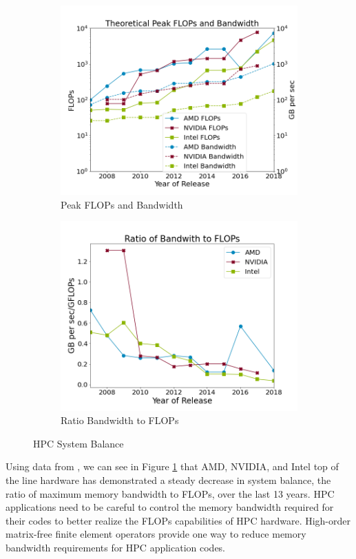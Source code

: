 \begin{figure}[h!]
\begin{subfigure}{.49\textwidth}
\includegraphics[width=.99\linewidth]{../img/peakFlopsAndBandwidth}
\caption{Peak FLOPs and Bandwidth}
\end{subfigure}
\begin{subfigure}{.49\textwidth}
\includegraphics[width=.99\linewidth]{../img/peakRatio}
\caption{Ratio Bandwidth to FLOPs}
\end{subfigure}
\caption{HPC System Balance}
\label{fig:peakratio}
\end{figure}

Using data from \cite{kruppcomparison}, we can see in Figure \ref{fig:peakratio} that AMD, NVIDIA, and Intel top of the line hardware has demonstrated a steady decrease in system balance, the ratio of maximum memory bandwidth to FLOPs, over the last 13 years.
HPC applications need to be careful to control the memory bandwidth required for their codes to better realize the FLOPs capabilities of HPC hardware.
High-order matrix-free finite element operators provide one way to reduce memory bandwidth requirements for HPC application codes.
